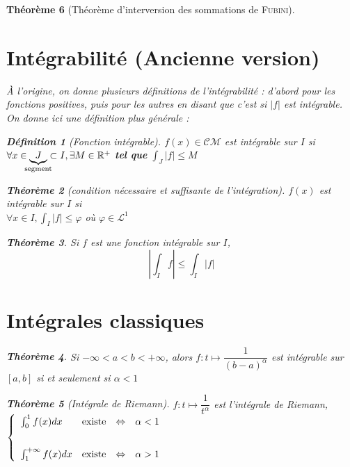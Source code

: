 \documentclass[11pt,a4paper]{report}
\newtheorem{theorem}{Théorème}[chapter]
\newtheorem{itheorem}[theorem]{Théorème}
\theoremstyle{definition}
\newtheorem{dfn}[theorem]{Définition}
\begin{document}
\begin{theorem}[Théorème d'interversion des sommations de \textsc{Fubini}]
{{\section{Intégrabilité (Ancienne version)}
À l'origine, on donne plusieurs définitions de l'intégrabilité : d'abord pour les fonctions positives, puis pour les autres en disant que c'est si $|f|$ est intégrable. On donne ici une définition plus générale : 
\begin{dfn}[Fonction intégrable]
$f(x)\in \mathcal{CM}$ est intégrable sur $I$ si \\
$\forall x \in \underbrace{J}_{\mathclap{\text{segment}}} \subset I, \exists M \in \ensuremath{\mathbb{R}}^+$ \textbf{tel que} $\int_J |f| \le M$
\end{dfn}

\begin{itheorem}[condition nécessaire et suffisante de l'intégration]
$f(x)$ est intégrable sur $I$ si \\
$\forall x \in I, \boxed{\int_I |f| \le \varphi}$ où $\varphi \in \mathscr{L}^1$
\end{itheorem}
\begin{theorem}
Si $f$ est une fonction intégrable sur $I$,
    \begin{equation}\label{eq:SommeIntegrale}
        \left| \int_I f \right| \le \int_I \left| f \right| 
    \end{equation}
\end{theorem}
\section{Intégrales classiques}
\begin{theorem}
Si $-\infty < a < b < +\infty$, alors $f:t\mapsto \dfrac{1}{(b-a)^\alpha}$ est intégrable sur $[a,b]$ si et seulement si $\boxed{\alpha < 1}$
\end{theorem}
\begin{theorem}[Intégrale de Riemann]
$f : t \mapsto \dfrac{1}{t^\alpha}$ est l'intégrale de Riemann,
$
\left\lbrace
\begin{array}{l c c l}
\int_0^1f(x)dx&\text{existe}&\Leftrightarrow&\alpha < 1\\[0.7cm]
\int_1^{+\infty}f(x)dx&\text{existe}&\Leftrightarrow&\alpha > 1
\end{array}
\right.
$
\end{theorem}
}}
\end{theorem}
\end{document}
